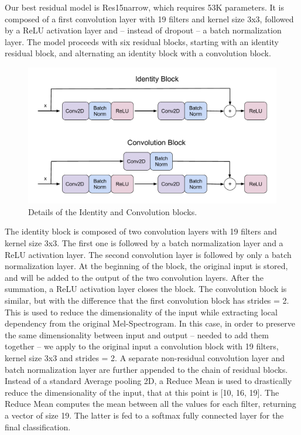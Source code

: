 Our best residual model is Res15narrow, which requires 53K parameters.
It is composed of a first convolution layer with 19 filters and kernel size 3x3, followed by a ReLU activation layer and -- instead of dropout -- a batch normalization layer. 
The model proceeds with six residual blocks, starting with an identity residual block, and alternating an identity block with a convolution block.
\begin{figure}[htbp]
\centerline{\includegraphics[scale=.47]{Identity_Conv_blocks.pdf}}
\caption{Details of the Identity and Convolution blocks.}
\label{fig}
\end{figure}
The identity block is composed of two convolution layers with 19 filters and kernel size 3x3. The first one is followed by a batch normalization layer and a ReLU activation layer. The second convolution layer is followed by only a batch normalization layer. At the beginning of the block, the original input is stored, and will be added to the output of the two convolution layers. After the summation, a ReLU activation layer closes the block.
The convolution block is similar, but with the difference that the first convolution block has strides = 2. This is used to reduce the dimensionality of the input while extracting local dependency from the original Mel-Spectrogram.
In this case, in order to preserve the same dimensionality between input and output -- needed to add them together -- we apply to the original input a convolution block with 19 filters, kernel size 3x3 and strides = 2.
A separate non-residual convolution layer and batch normalization layer are further appended to the chain of residual blocks. Instead of a standard Average pooling 2D, a Reduce Mean is used to drastically reduce the dimensionality of the input, that at this point is [10, 16, 19]. The Reduce Mean computes the mean between all the values for each filter, returning a vector of size 19. The latter is fed to a softmax fully connected layer for the final classification.
